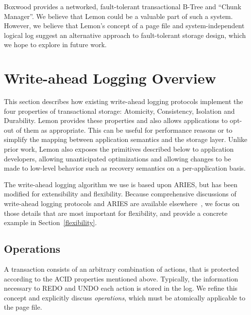 \documentclass[10pt,letterpaper,twocolumn,english]{article}
\newcommand{\yad}{Lemon\xspace}
\newcommand{\eab}[1]{\textcolor{red}{\bf EAB: #1}}
\newcommand{\rcs}[1]{\textcolor{green}{\bf RCS: #1}}
\begin{document}

Boxwood provides a networked, fault-tolerant transactional B-Tree and
``Chunk Manager''.  We believe that \yad could be a valuable part of
such a system.  However, we believe that \yad's concept of a page file
and system-independent logical log suggest an alternative approach to
fault-tolerant storage design, which we hope to explore in future
work.






\section{Write-ahead Logging Overview}

This section describes how existing write-ahead logging protocols
implement the four properties of transactional storage: Atomicity,
Consistency, Isolation and Durability.  \yad provides these
properties and also allows applications to opt-out of
them as appropriate.  This can be useful for
performance reasons or to simplify the mapping between application
semantics and the storage layer.  Unlike prior work, \yad also exposes
the primitives described below to application developers, allowing
unanticipated optimizations and allowing changes to be made to low-level
behavior such as recovery semantics on a per-application basis.

The write-ahead logging algorithm we use is based upon ARIES, but has been
modified for extensibility and flexibility. Because comprehensive
discussions of write-ahead logging protocols and ARIES are available
elsewhere~\cite{haerder, aries}, we focus on those details that are
most important for flexibility, and provide a concrete example in Section~\ref{flexibility}.


\subsection{Operations}
\label{sub:OperationProperties}

A transaction consists of an arbitrary combination of actions, that
is protected according to the ACID properties mentioned above.
Typically, the
information necessary to REDO and UNDO each action is stored in the
log.  We refine this concept and explicitly discuss {\em operations},
which must be atomically applicable to the page file.  
\end{document}
